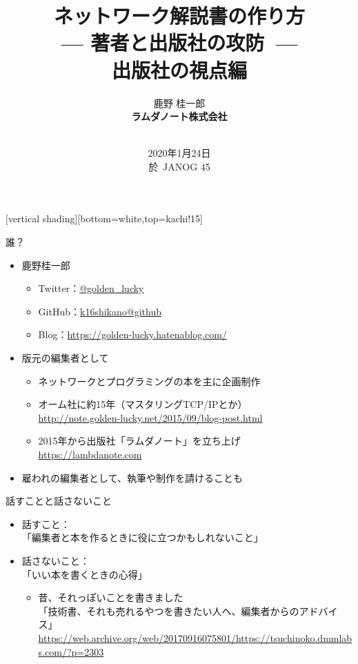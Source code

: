 \documentclass[14pt,dvipdfmx,uplatex]{beamer}
\title{ネットワーク解説書の作り方 \\ --- 著者と出版社の攻防\ --- \\ 出版社の視点編}
\author{\sffamily 鹿野 桂一郎\\
\bfseries ラムダノート株式会社\\
\small\bfseries \email{k16.shikano@lambdanote.com} \\ 
}
\date{\sffamily\footnotesize 2020年1月24日\\ 於\, JANOG 45}
\begin{document}
\bfseries{}\selectfont

\frame{\titlepage}

[vertical shading][bottom=white,top=kachi!15]

\begin{frame}[t]{\inhibitglue 誰？}
  \sffamily\bfseries
  \begin{itemize}
      \item 鹿野桂一郎
        \begin{itemize}
           \item Twitter：\href{https://twitter.com/golden_lucky}{@golden\_lucky}
           \item GitHub：\href{https://github.com/k16shikano}{k16shikano@github}
           \item Blog：\url{https://golden-lucky.hatenablog.com/}
        \end{itemize}
      \item 版元の編集者として
        \begin{itemize}
           \item ネットワークとプログラミングの本を主に企画制作
           \item オーム社に約15年（マスタリングTCP/IPとか）\\
              {\small \url{http://note.golden-lucky.net/2015/09/blog-post.html}}
           \item 2015年から出版社「ラムダノート」を立ち上げ\\
              \url{https://lambdanote.com}
        \end{itemize}
      \item 雇われの編集者として、執筆や制作を請けることも
  \end{itemize}
\end{frame}

\begin{frame}[t]{\inhibitglue 話すことと話さないこと}
  \sffamily
  \begin{itemize}
  \item
    話すこと：\\ 「編集者と本を作るときに役に立つかもしれないこと」
  \item
    話さないこと：\\ 「いい本を書くときの心得」
    \begin{itemize}
      \item 昔、それっぽいことを書きました \\
        \footnotesize 「技術書、それも売れるやつを書きたい人へ、編集者からのアドバイス」\\ \url{https://web.archive.org/web/20170916075801/https://tsuchinoko.dmmlabs.com/?p=2303}
    \end{itemize}
  \end{itemize}
\end{frame}
\end{document}
